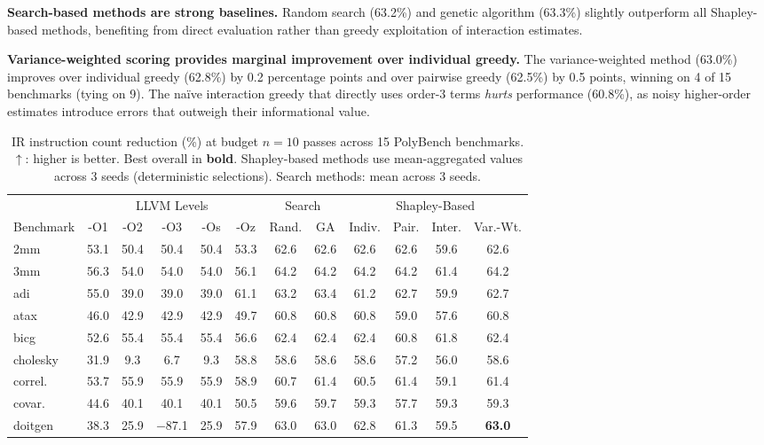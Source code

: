 \documentclass[preprint]{article}
\begin{document}
\textbf{Search-based methods are strong baselines.} Random search (63.2\%) and genetic algorithm (63.3\%) slightly outperform all Shapley-based methods, benefiting from direct evaluation rather than greedy exploitation of interaction estimates.

\textbf{Variance-weighted scoring provides marginal improvement over individual greedy.} The variance-weighted method (63.0\%) improves over individual greedy (62.8\%) by 0.2 percentage points and over pairwise greedy (62.5\%) by 0.5 points, winning on 4 of 15 benchmarks (tying on 9). The na\"ive interaction greedy that directly uses order-3 terms \emph{hurts} performance (60.8\%), as noisy higher-order estimates introduce errors that outweigh their informational value.

\begin{table}[t]
\caption{IR instruction count reduction (\%) at budget $n{=}10$ passes across 15 PolyBench benchmarks. $\uparrow$: higher is better. Best overall in \textbf{bold}. Shapley-based methods use mean-aggregated values across 3 seeds (deterministic selections). Search methods: mean across 3 seeds.}
\label{tab:main}
\centering
\footnotesize
\begin{tabular}{l|ccccc|cc|cccc}
\toprule
 & \multicolumn{5}{c|}{LLVM Levels} & \multicolumn{2}{c|}{Search} & \multicolumn{4}{c}{Shapley-Based} \\
Benchmark & -O1 & -O2 & -O3 & -Os & -Oz & Rand. & GA & Indiv. & Pair. & Inter. & Var.-Wt. \\
\midrule
2mm      & 53.1 & 50.4 & 50.4 & 50.4 & 53.3 & 62.6 & 62.6 & 62.6 & 62.6 & 59.6 & 62.6 \\
3mm      & 56.3 & 54.0 & 54.0 & 54.0 & 56.1 & 64.2 & 64.2 & 64.2 & 64.2 & 61.4 & 64.2 \\
adi      & 55.0 & 39.0 & 39.0 & 39.0 & 61.1 & 63.2 & 63.4 & 61.2 & 62.7 & 59.9 & 62.7 \\
atax     & 46.0 & 42.9 & 42.9 & 42.9 & 49.7 & 60.8 & 60.8 & 60.8 & 59.0 & 57.6 & 60.8 \\
bicg     & 52.6 & 55.4 & 55.4 & 55.4 & 56.6 & 62.4 & 62.4 & 62.4 & 60.8 & 61.8 & 62.4 \\
cholesky & 31.9 & 9.3 & 6.7 & 9.3 & 58.8 & 58.6 & 58.6 & 58.6 & 57.2 & 56.0 & 58.6 \\
correl.  & 53.7 & 55.9 & 55.9 & 55.9 & 58.9 & 60.7 & 61.4 & 60.5 & 61.4 & 59.1 & 61.4 \\
covar.   & 44.6 & 40.1 & 40.1 & 40.1 & 50.5 & 59.6 & 59.7 & 59.3 & 57.7 & 59.3 & 59.3 \\
doitgen  & 38.3 & 25.9 &$-$87.1& 25.9 & 57.9 & 63.0 & 63.0 & 62.8 & 61.3 & 59.5 & \textbf{63.0} \\

\end{tabular}
\end{table}
\end{document}
